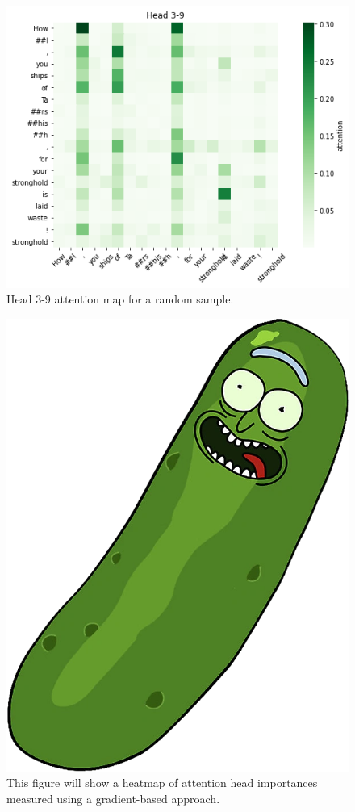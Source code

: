 \documentclass{dcthesis}
\theoremstyle{definition}
\theoremstyle{remark}
\begin{document}
\begin{figure}
  \centering
  \includegraphics[scale=0.8]{head_3-9.png}
  \captionsetup{justification=centering}
  \caption{\label{fig:head_3-9} Head 3-9 attention map for a random sample.}
\end{figure}

\begin{figure}
  \centering
  \includegraphics[scale=0.1]{images/pickle.png}
  \caption{\label{fig:attn_feature_importances} This figure will show a heatmap of attention head importances measured using a gradient-based approach.}
\end{figure}
\end{document}
